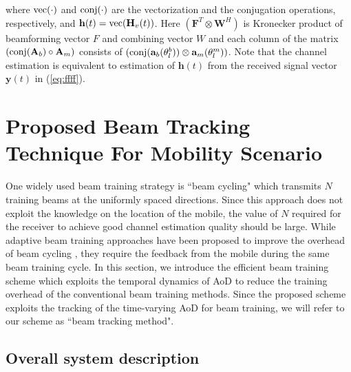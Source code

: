 \documentclass[conference]{IEEEtran}
\begin{document}
where ${\rm vec}(\cdot)$ and ${\rm conj}(\cdot)$ are the vectorization and the conjugation operations, respectively,
and $\mathbf{h}(t)={\rm vec}(\mathbf{H}_{v}(t))$. Here $(\mathbf{F}^{T} \otimes \mathbf{W}^{H})$ is Kronecker product of beamforming vector $F$ and combining vector $W$ and each column of the matrix $({\rm conj}(\mathbf{A}_b)\circ \mathbf{A}_m)$ consists of $({\rm conj}(\mathbf{a}_b(\theta^{b}_{l}))\otimes\mathbf{a}_m(\theta^{m}_{l}))$.
Note that the channel estimation is equivalent to estimation of  $\mathbf{h}(t)$ from the received signal vector  $ \mathbf{y}(t)$ in (\ref{eq:ffff}).

\section{Proposed Beam Tracking Technique For Mobility Scenario} \label{sec_proscheme}

One widely used beam training strategy is ``beam cycling" which transmits $N$ training beams at the uniformly spaced directions.
Since this approach  does not exploit the knowledge on the location of the mobile, the value of $N$ required for the receiver to achieve good channel estimation quality should be large.   While adaptive beam training approaches have been proposed to improve the overhead of beam cycling  \cite{ref:ad_beam_Ayach,ref:ad_beam_Tsang,ref:ad_beam_Venkateswaran,ref:ad_beam_Wang,ref:ad_beam_Zhang},  they require the feedback from the mobile during the same beam training cycle.
In this section, we introduce the efficient beam training scheme which exploits the temporal dynamics of AoD to reduce the training overhead of the conventional beam training methods.
Since the proposed scheme exploits the tracking of the time-varying AoD for beam training, we will refer to our scheme as ``beam tracking method".

\subsection{Overall system description}
\end{document}
